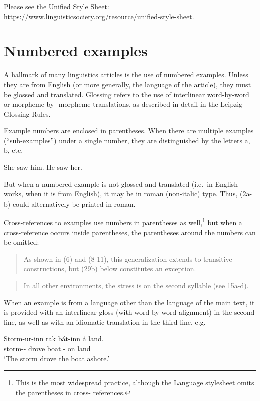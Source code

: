 \documentclass[a4paper]{article}
\newenvironment{gsrexq}{\begin{quote}\color{blue}}{\end{quote}}
\newcommand{\eagsr}{\bgroup\color{blue}\ea}
\newcommand{\zgsr}{\z\egroup}
\begin{document}
Please see the Unified Style Sheet:\\ \url{https://www.linguisticsociety.org/resource/unified-style-sheet}.

\section{Numbered examples}\label{sec:numberedexamples}

A hallmark of many linguistics articles is the use of numbered examples.
Unless they are from English (or more generally, the language of the
article), they must be glossed and translated. Glossing refers to the
use of interlinear word-by-word or morpheme-by- morpheme translations,
as described in detail in the Leipzig Glossing Rules. 

Example numbers
are enclosed in parentheses. When there are multiple examples
(``sub-examples'') under a single number, they are distinguished by the
letters a, b, etc.

\eagsr
  \eagsr She saw him. 
  \ex He saw her.
  \zgsr
\zgsr

But when a numbered example is not glossed and translated (i.e.~in
English works, when it is from English), it may be in roman (non-italic)
type. Thus, (2a-b) could alternatively be printed in roman.

Cross-references to examples use numbers in parentheses as well,\footnote{This is the most widespread practice, although the Language stylesheet omits the parentheses in cross- references.} but when a cross-reference occurs inside parentheses, the parentheses around the numbers can be omitted:

\begin{gsrexq}
  As shown in (6) and (8-11), this generalization extends to transitive constructions, but (29b) below constitutes an exception.
\end{gsrexq}

\begin{gsrexq}
  In all other environments, the stress is on the second syllable (see 15a-d).
\end{gsrexq}

When an example is from a language other than the language of the main text, it
is provided with an interlinear gloss (with word-by-word alignment) in
the second line, as well as with an idiomatic translation in the third
line, e.g.

\eagsr
\gll Storm-ur-inn  rak   bát-inn      á land.\\
     storm-\NOM-\DEF{} drove boat.\ACC-\DEF{} on land\\
\glt     `The storm drove the boat ashore.'
\zgsr
\end{document}

